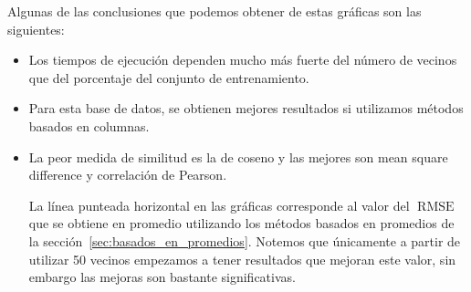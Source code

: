 \documentclass[spanish]{article}                 %
\numberwithin{equation}{section}                 %
\theoremstyle{definition}
\DeclareMathOperator{\RMSE}{RMSE}
\begin{document}
Algunas de las conclusiones que podemos obtener de estas gráficas son las siguientes:
\begin{itemize}
    \item Los tiempos de ejecución dependen mucho más fuerte del número de vecinos que del porcentaje del conjunto de entrenamiento.
    \item Para esta base de datos, se obtienen mejores resultados si utilizamos métodos basados en columnas.
    \item La peor medida de similitud es la de coseno y las mejores son mean square difference y correlación de Pearson.

        La línea punteada horizontal en las gráficas corresponde al valor del $\RMSE$ que se obtiene en promedio utilizando los métodos basados en promedios de la sección~\ref{sec:basados_en_promedios}. Notemos que únicamente a partir de utilizar 50 vecinos empezamos a tener resultados que mejoran este valor, sin embargo las mejoras son bastante significativas.
\end{itemize}
\end{document}
